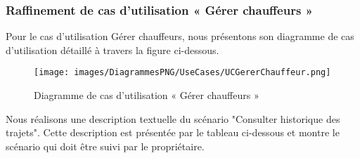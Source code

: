 {\subsubsection{Raffinement de cas d'utilisation « Gérer chauffeurs »}
Pour le cas d'utilisation Gérer chauffeurs, nous présentons son diagramme de cas d'utilisation détaillé à travers la figure ci-dessous.
\begin{figure}[H]
\centering
\texttt{[image: images/DiagrammesPNG/UseCases/UCGererChauffeur.png]}
\caption{Diagramme de cas d'utilisation « Gérer chauffeurs »}
\end{figure}

Nous réalisons une description textuelle du scénario "Consulter historique des trajets". Cette description est présentée par le tableau ci-dessous et montre le scénario qui doit être suivi par le propriétaire.\\


}
